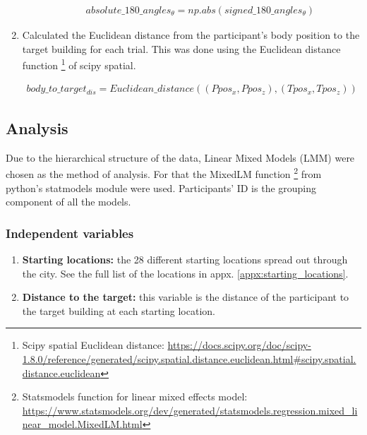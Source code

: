 \begin{enumerate}
\begin{enumerate}
		\begin{align*}
			absolute\_180\_angles_{\theta} = np.abs(signed\_180\_angles_{\theta})
		\end{align*}
		
	\end{enumerate}

	\item Calculated the Euclidean distance from the participant's body position to the target building for each trial. This was done using the Euclidean distance function \footnote{Scipy spatial Euclidean distance: \href{https://docs.scipy.org/doc/scipy-1.8.0/reference/generated/scipy.spatial.distance.euclidean.html\#scipy.spatial.distance.euclidean}{https://docs.scipy.org/doc/scipy-1.8.0/reference/generated/scipy.spatial.distance.euclidean.html\#scipy.spatial.distance.euclidean}} of scipy spatial.
	
	\begin{align*}
		body\_to\_target_{dis} = Euclidean\_distance((Ppos_x, Ppos_z), (Tpos_x, Tpos_z))
	\end{align*}

\end{enumerate}



\subsection{Analysis}
Due to the hierarchical structure of the data, Linear Mixed Models (LMM) were chosen as the method of analysis. For that the MixedLM function \footnote{Statsmodels function for linear mixed effects model: \\ \href{https://www.statsmodels.org/dev/generated/statsmodels.regression.mixed\_linear\_model.MixedLM.html}{https://www.statsmodels.org/dev/generated/statsmodels.regression.mixed\_linear\_model.MixedLM.html}} from python's statmodels module were used. Participants' ID is the grouping component of all the models.

\subsubsection{Independent variables}

\begin{enumerate}
	\item \textbf{Starting locations:} the 28 different starting locations spread out through the city. See the full list of the locations in appx. \ref{appx:starting_locations}. \\
	
	\item \textbf{Distance to the target:} this variable is the distance of the participant to the target building at each starting location.
\end{enumerate}

